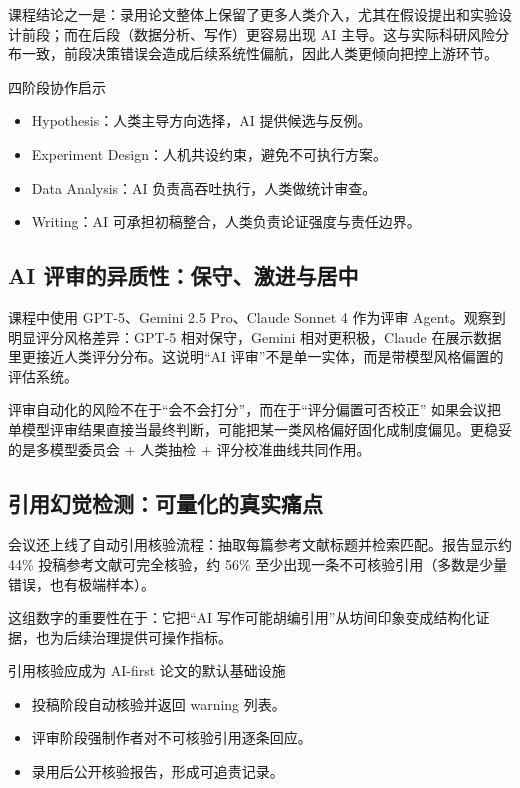 \documentclass[a4paper]{article}
\begin{document}
课程结论之一是：录用论文整体上保留了更多人类介入，尤其在假设提出和实验设计前段；而在后段（数据分析、写作）更容易出现 AI 主导。这与实际科研风险分布一致，前段决策错误会造成后续系统性偏航，因此人类更倾向把控上游环节。

\begin{knowledgebox}{四阶段协作启示}
\begin{itemize}
    \item Hypothesis：人类主导方向选择，AI 提供候选与反例。
    \item Experiment Design：人机共设约束，避免不可执行方案。
    \item Data Analysis：AI 负责高吞吐执行，人类做统计审查。
    \item Writing：AI 可承担初稿整合，人类负责论证强度与责任边界。
\end{itemize}
\end{knowledgebox}

\subsection{AI 评审的异质性：保守、激进与居中}

课程中使用 GPT-5、Gemini 2.5 Pro、Claude Sonnet 4 作为评审 Agent。观察到明显评分风格差异：GPT-5 相对保守，Gemini 相对更积极，Claude 在展示数据里更接近人类评分分布。这说明``AI 评审''不是单一实体，而是带模型风格偏置的评估系统。

\begin{warningbox}{评审自动化的风险不在于``会不会打分''，而在于``评分偏置可否校正''}
如果会议把单模型评审结果直接当最终判断，可能把某一类风格偏好固化成制度偏见。更稳妥的是多模型委员会 + 人类抽检 + 评分校准曲线共同作用。
\end{warningbox}

\subsection{引用幻觉检测：可量化的真实痛点}

会议还上线了自动引用核验流程：抽取每篇参考文献标题并检索匹配。报告显示约 44\% 投稿参考文献可完全核验，约 56\% 至少出现一条不可核验引用（多数是少量错误，也有极端样本）。

这组数字的重要性在于：它把``AI 写作可能胡编引用''从坊间印象变成结构化证据，也为后续治理提供可操作指标。

\begin{importantbox}{引用核验应成为 AI-first 论文的默认基础设施}
\begin{itemize}
    \item 投稿阶段自动核验并返回 warning 列表。
    \item 评审阶段强制作者对不可核验引用逐条回应。
    \item 录用后公开核验报告，形成可追责记录。
\end{itemize}
\end{importantbox}
\end{document}
